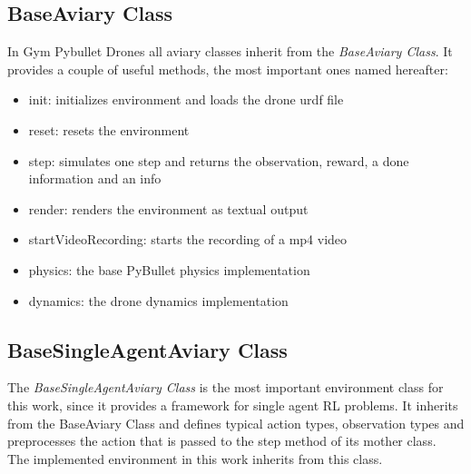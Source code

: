 \subsection{BaseAviary Class}
In Gym Pybullet Drones all aviary classes inherit from the \emph{BaseAviary Class}. It provides a couple of useful methods, the most important ones named hereafter:
\begin{itemize}
	\item init: initializes environment and loads the drone urdf file
	\item reset: resets the environment
	\item step: simulates one step and returns the observation, reward, a done information and an info
	\item render: renders the environment as textual output
	\item startVideoRecording: starts the recording of a mp4 video
	\item physics: the base PyBullet physics implementation
	\item dynamics: the drone dynamics implementation
\end{itemize}

\subsection{BaseSingleAgentAviary Class}
The \emph{BaseSingleAgentAviary Class} is the most important environment class for this work, since it provides a framework for single agent RL problems. It inherits from the BaseAviary Class and defines typical action types, observation types and preprocesses the action that is passed to the step method of its mother class.\\
The implemented environment in this work inherits from this class.
